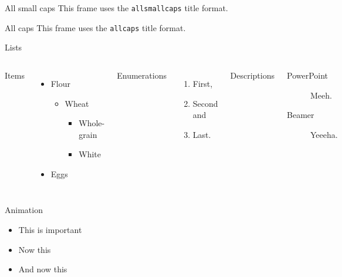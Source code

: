 {
\begin{frame}{All small caps}
  This frame uses the \texttt{allsmallcaps} title format.
\end{frame}
}

{
\begin{frame}{All caps}
  This frame uses the \texttt{allcaps} title format.
\end{frame}
}

\begin{frame}{Lists}
  \begin{columns}[T,onlytextwidth]
    Items
    \begin{itemize}
      \item Flour
            \begin{itemize}
              \item Wheat
                    \begin{itemize}
                      \item Whole-grain
                      \item White
                    \end{itemize}
            \end{itemize}
      \item Eggs
    \end{itemize}

    Enumerations
    \begin{enumerate}
      \item First, \item Second and \item Last.
    \end{enumerate}

    Descriptions
    \begin{description}
      \item[PowerPoint] Meeh. \item[Beamer] Yeeeha.
    \end{description}
  \end{columns}
\end{frame}

\begin{frame}{Animation}
  \begin{itemize}[<+- | alert@+>]
    \item \alert<4>{This is important}
    \item Now this
    \item And now this
  \end{itemize}
\end{frame}

